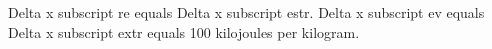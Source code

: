 Delta x subscript re equals Delta x subscript estr.
Delta x subscript ev equals Delta x subscript extr equals 100 kilojoules per kilogram.